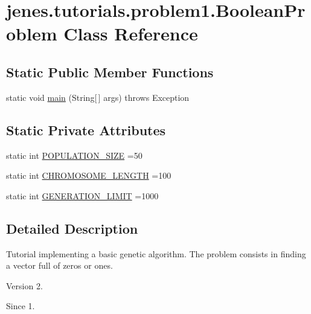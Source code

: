 \hypertarget{classjenes_1_1tutorials_1_1problem1_1_1_boolean_problem}{\section{jenes.\-tutorials.\-problem1.\-Boolean\-Problem Class Reference}
\label{classjenes_1_1tutorials_1_1problem1_1_1_boolean_problem}
}
\subsection*{Static Public Member Functions}
\begin{DoxyCompactItemize}
\item 
static void \hyperlink{classjenes_1_1tutorials_1_1problem1_1_1_boolean_problem_a04df83435bdce30ece47f2407f186d14}{main} (String\mbox{[}$\,$\mbox{]} args)  throws Exception 
\end{DoxyCompactItemize}
\subsection*{Static Private Attributes}
\begin{DoxyCompactItemize}
\item 
static int \hyperlink{classjenes_1_1tutorials_1_1problem1_1_1_boolean_problem_ae2de55d7e4eebd12eb9a904fce0ad017}{P\-O\-P\-U\-L\-A\-T\-I\-O\-N\-\_\-\-S\-I\-Z\-E} =50
\item 
static int \hyperlink{classjenes_1_1tutorials_1_1problem1_1_1_boolean_problem_afb73372d123861e2c7856df4a9583d3c}{C\-H\-R\-O\-M\-O\-S\-O\-M\-E\-\_\-\-L\-E\-N\-G\-T\-H} =100
\item 
static int \hyperlink{classjenes_1_1tutorials_1_1problem1_1_1_boolean_problem_afc8bd1707654947d7ae723c66b569647}{G\-E\-N\-E\-R\-A\-T\-I\-O\-N\-\_\-\-L\-I\-M\-I\-T} =1000
\end{DoxyCompactItemize}


\subsection{Detailed Description}
Tutorial implementing a basic genetic algorithm. The problem consists in finding a vector full of zeros or ones.

\begin{DoxyVersion}{Version}
2. 
\end{DoxyVersion}
\begin{DoxySince}{Since}
1. 
\end{DoxySince}


